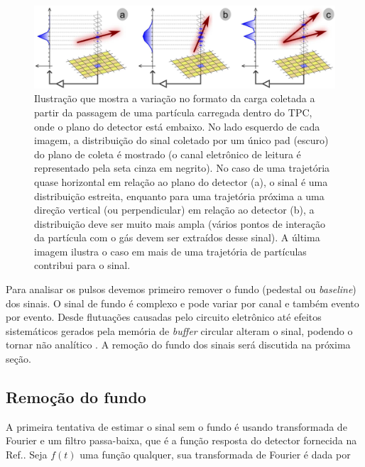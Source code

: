 \documentclass[a4paper,12pt,oneside]{book}
\begin{document}
\begin{figure}[H]
    \centering
    \includegraphics[scale = 0.325]{figs/get.png}
    \caption{Ilustração que mostra a variação no formato da carga coletada a partir da passagem de uma partícula carregada dentro do TPC, onde o plano do detector está embaixo. No lado esquerdo de cada imagem, a distribuição do sinal coletado por um único pad (escuro) do plano de coleta é mostrado (o canal eletrônico de leitura é representado pela seta cinza em negrito). No caso de uma trajetória quase horizontal em relação ao plano do detector (a), o sinal é uma distribuição estreita, enquanto para uma trajetória próxima a uma direção vertical (ou perpendicular) em relação ao detector (b), a distribuição deve ser muito mais ampla (vários pontos de interação da partícula com o gás devem ser extraídos desse sinal). A última imagem ilustra o caso em mais de uma trajetória de partículas contribui para o sinal\cite{GET}.}
    \label{fig:get_signal}
\end{figure}

\par Para analisar os pulsos devemos primeiro remover o fundo (pedestal ou \textit{baseline}) dos sinais. O sinal de fundo é complexo e pode variar por canal e também evento por evento. Desde flutuações causadas pelo circuito eletrônico até efeitos sistemáticos gerados pela memória de \textit{buffer} circular alteram o sinal, podendo o tornar não analítico \cite{FORTINO2022166497, GET}. A remoção do fundo dos sinais será discutida na próxima seção. 


\subsection{Remoção do fundo}\label{subsec:pulses_baseline}

A primeira tentativa de estimar o sinal sem o fundo é usando transformada de Fourier e um filtro passa-baixa, que é a função resposta do detector fornecida na Ref.\cite{GET}. Seja $f(t)$ uma função qualquer, sua transformada de Fourier é dada por
\end{document}
